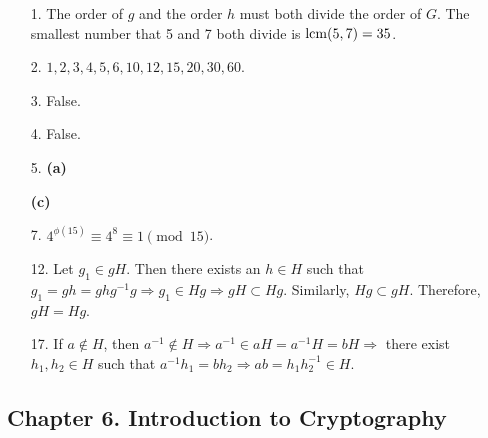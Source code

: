 {\small
\begin{itemize}
 
\bf\item[1.]\rm
The order of $g$ and the order $h$ must both divide the order of $G$.
The smallest number that 5 and 7 both divide is  $\operatorname{lcm}( 5, 7 ) = 35$.
 
\bf\item[2.]\rm 
$1, 2, 3, 4, 5, 6, 10, 12, 15, 20, 30, 60$.
 
\bf\item[3.]\rm 
False.
 
\bf\item[4.]\rm  
False.
 
\bf\item[5.]\rm
{\bf (a)} 
\raisebox{-18pt}{\parbox{4in}{
\[
\begin{array}{rclccrcl}
    H & = & \{ 0, 8, 16 \} && 4 + H & = & \{ 4, 12, 20 \} \\
1 + H & = & \{ 1, 9, 17 \} && 5 + H & = & \{ 5, 13, 21 \} \\
2 + H & = & \{ 2, 10, 18\} && 6 + H & = & \{ 6, 14, 22 \} \\
3 + H & = & \{ 3, 11, 19\} && 7 + H & = & \{ 7, 15, 23 \}. 
\end{array}
\]
}}

{\bf (c)}
 
\bf\item[7.]\rm
$4^{\phi(15)} \equiv 4^8 \equiv 1 \pmod{15}$.
 
\bf\item[12.]\rm
Let $g_1 \in gH$. Then there exists an $h \in H$ such that $g_1 = gh
= ghg^{-1} g \Rightarrow g_1 \in Hg \Rightarrow gH \subset Hg$.
Similarly, $Hg \subset gH$. Therefore, $gH = Hg$.
 
\bf\item[17.]\rm
If $a \notin H$, then $a^{-1} \notin H \Rightarrow a^{-1} \in a H =
a^{-1} H = bH \Rightarrow$ there exist $h_1, h_2 \in H$ such that
$a^{-1} h_1 = b h_2 \Rightarrow ab = h_1 h_2^{-1} \in H$.
 
\end{itemize}
}
 
\subsection*{Chapter 6. Introduction to Cryptography}
 
